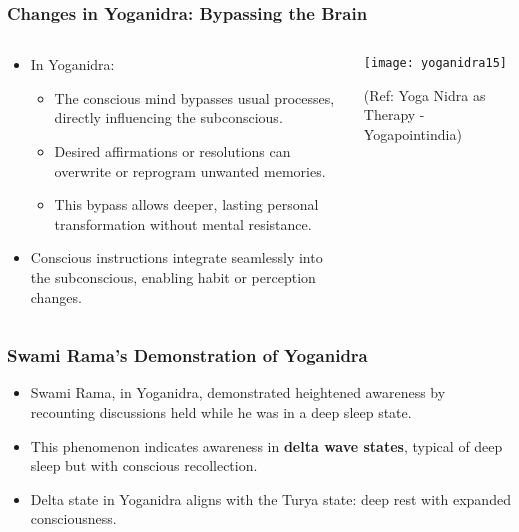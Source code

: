 \begin{frame}[fragile]\frametitle{Changes in Yoganidra: Bypassing the Brain}

    \begin{columns}
        \begin{column}{0.48\textwidth}
			\begin{itemize}
				\item In Yoganidra:
					\begin{itemize}
						\item The conscious mind bypasses usual processes, directly influencing the subconscious.
						\item Desired affirmations or resolutions can overwrite or reprogram unwanted memories.
						\item This bypass allows deeper, lasting personal transformation without mental resistance.
					\end{itemize}
				\item Conscious instructions integrate seamlessly into the subconscious, enabling habit or perception changes.
			\end{itemize}
        \end{column}
        \begin{column}{0.48\textwidth}	
			  \begin{center}
				\texttt{[image: yoganidra15]}

				{\tiny (Ref: Yoga Nidra as Therapy - Yogapointindia)}		
				\end{center}	
        \end{column}
    \end{columns}	
	

\end{frame}

\begin{frame}[fragile]\frametitle{Swami Rama’s Demonstration of Yoganidra}
    \begin{itemize}
        \item Swami Rama, in Yoganidra, demonstrated heightened awareness by recounting discussions held while he was in a deep sleep state.
        \item This phenomenon indicates awareness in \textbf{delta wave states}, typical of deep sleep but with conscious recollection.
        \item Delta state in Yoganidra aligns with the Turya state: deep rest with expanded consciousness.
    \end{itemize}
\end{frame}

